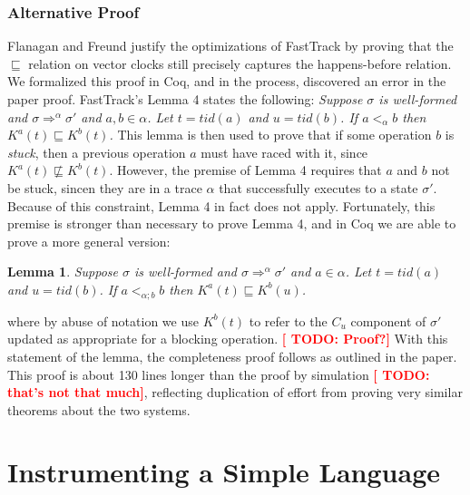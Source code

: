 \documentclass[preprint, 10pt]{sigplanconf}
\newcommand{\TODO}[1]{\textbf{\textcolor{red}{[ TODO: #1]}}}
\newtheorem{lemma}{Lemma}
\begin{document}
\subsubsection{Alternative Proof}
Flanagan and Freund justify the optimizations of FastTrack by proving that the $\sqsubseteq$ relation on vector clocks still precisely captures the happens-before relation. We formalized this proof in Coq, and in the process, discovered an error in the paper proof. FastTrack's Lemma 4 states the following: {\it Suppose $\sigma$ is well-formed and $\sigma \Rightarrow^\alpha \sigma'$ and $a, b \in \alpha$. Let $t = \mathit{tid}(a)$ and $u = \mathit{tid}(b)$. If $a <_{\alpha} b$ then $K^a(t) \sqsubseteq K^b(t)$.} This lemma is then used to prove that if some operation $b$ is \emph{stuck}, then a previous operation $a$ must have raced with it, since $K^a(t) \not\sqsubseteq K^b(t)$. However, the premise of Lemma 4 requires that $a$ and $b$ not be stuck, sincen they are in a trace $\alpha$ that successfully executes to a state $\sigma'$. Because of this constraint, Lemma 4 in fact does not apply. Fortunately, this premise is stronger than necessary to prove Lemma 4, and in Coq we are able to prove a more general version:
\begin{lemma}Suppose $\sigma$ is well-formed and $\sigma \Rightarrow^\alpha \sigma'$ and $a \in \alpha$. Let $t = \mathit{tid}(a)$ and $u = \mathit{tid}(b)$. If $a <_{\alpha; b} b$ then $K^a(t) \sqsubseteq K^b(u)$.\end{lemma}
where by abuse of notation we use $K^b(t)$ to refer to the $C_u$ component of $\sigma'$ updated as appropriate for a blocking operation. \TODO{Proof?} With this statement of the lemma, the completeness proof follows as outlined in the paper. This proof is about 130 lines longer than the proof by simulation \TODO{that's not that much}, reflecting duplication of effort from proving very similar theorems about the two systems.

\section{Instrumenting a Simple Language}
\label{language}
\end{document}
